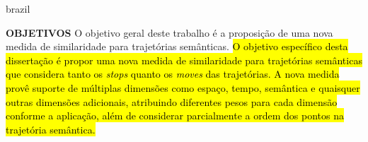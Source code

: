 {\begin{otherlanguage*}{brazil}
\begin{resumo}
        \newline
        \newline
        \textbf{OBJETIVOS}
        \newline
        \newline
        O objetivo geral deste trabalho é a proposição de uma nova medida de similaridade para trajetórias semânticas.
        \newline
        \hl{O objetivo específico desta dissertação é propor uma nova medida de similaridade para trajetórias semânticas que considera tanto os \emph{stops} quanto os \emph{moves} das trajetórias. A nova medida provê suporte de múltiplas dimensões como espaço, tempo, semântica e quaisquer outras dimensões adicionais, atribuindo diferentes pesos para cada dimensão conforme a aplicação, além de considerar parcialmente a ordem dos pontos na trajetória semântica.}
        \newline
        \newline
        

\end{resumo}
\end{otherlanguage*}}
